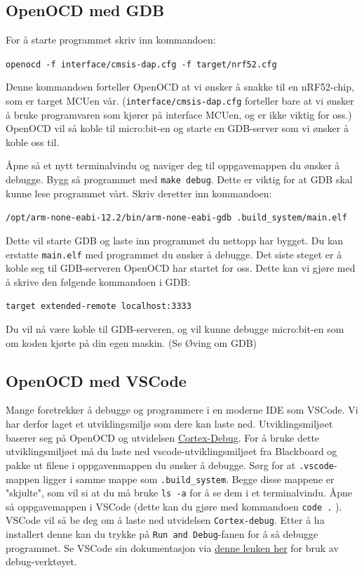 \subsection*{OpenOCD med GDB}

For å starte programmet skriv inn kommandoen:

\verb|openocd -f interface/cmsis-dap.cfg -f target/nrf52.cfg|

Denne kommandoen forteller OpenOCD at vi ønsker å snakke til en nRF52-chip, som er target MCUen vår. (\verb|interface/cmsis-dap.cfg| forteller bare at vi ønsker å bruke programvaren som kjører på interface MCUen, og er ikke viktig for oss.) OpenOCD vil så koble til micro:bit-en og starte en GDB-server som vi ønsker å koble oss til. 

Åpne så et nytt terminalvindu og naviger deg til oppgavemappen du ønsker å debugge. Bygg så programmet med \verb|make debug|. Dette er viktig for at GDB skal kunne lese programmet vårt. Skriv deretter inn kommandoen:

\verb|/opt/arm-none-eabi-12.2/bin/arm-none-eabi-gdb .build_system/main.elf|

Dette vil starte GDB og laste inn programmet du nettopp har bygget. Du kan erstatte \verb|main.elf| med programmet du ønsker å debugge. Det siste steget er å koble seg til GDB-serveren OpenOCD har startet for oss. Dette kan vi gjøre med å skrive den følgende kommandoen i GDB:

\verb|target extended-remote localhost:3333|

Du vil nå være koble til GDB-serveren, og vil kunne debugge micro:bit-en som om koden kjørte på din egen maskin. (Se Øving om GDB)

\subsection*{OpenOCD med VSCode}

Mange foretrekker å debugge og programmere i en moderne IDE som VSCode. Vi har derfor laget et utviklingsmiljø som dere kan laste ned. Utviklingsmiljøet baserer seg på OpenOCD og utvidelsen \href{https://open-vsx.org/extension/marus25/cortex-debug}{Cortex-Debug}. For å bruke dette utviklingsmiljøet må du laste ned vscode-utviklingsmiljøet fra Blackboard og pakke ut filene i oppgavenmappen du ønsker å debugge. Sørg for at \verb|.vscode|-mappen ligger i samme mappe som \verb|.build_system|. Begge disse mappene er "skjulte", som vil si at du må bruke \verb|ls -a| for å se dem i et terminalvindu. Åpne så oppgavemappen i VSCode (dette kan du gjøre med kommandoen \verb|code .| ). VSCode vil så be deg om å laste ned utvidelsen \verb|Cortex-debug|. Etter å ha installert denne kan du trykke på \verb|Run and Debug|-fanen for å så debugge programmet. Se VSCode sin dokumentasjon via \href{https://code.visualstudio.com/Docs/editor/debugging}{denne lenken her} for bruk av debug-verktøyet.

